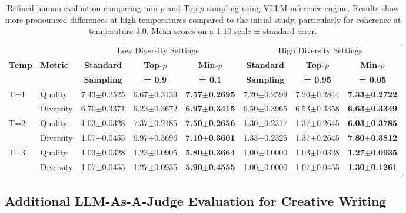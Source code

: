 \documentclass{article}
\begin{document}
\begin{table}[t]
    \centering
    \small
    \caption{Refined human evaluation comparing min-\( p \) and Top-\(p\) sampling using VLLM inference engine. Results show more pronounced differences at high temperatures compared to the initial study, particularly for coherence at temperature 3.0. Mean scores on a 1-10 scale ± standard error.}
    \label{tab:vllm_human_eval}
    \begin{tabular}{llcccccc}
        \toprule
        & & \multicolumn{3}{c}{Low Diversity Settings} & \multicolumn{3}{c}{High Diversity Settings} \\
        \cmidrule(lr){3-5} \cmidrule(lr){6-8}
        \textbf{Temp} & \textbf{Metric} & \textbf{Standard} & \textbf{Top-\(p\)} & \textbf{Min-\( p \)} & \textbf{Standard} & \textbf{Top-\(p\)} & \textbf{Min-\( p \)} \\
        & & \textbf{Sampling} & \textbf{= 0.9} & \textbf{= 0.1} & \textbf{Sampling} & \textbf{= 0.95} & \textbf{= 0.05} \\
        \midrule
        T=1 & Quality & 7.43$\pm$0.2525 & 6.67$\pm$0.3139 & \textbf{7.57$\pm$0.2695} & 7.20$\pm$0.2599 & 7.20$\pm$0.2844 & \textbf{7.33$\pm$0.2722} \\
        & Diversity & 6.70$\pm$0.3371 & 6.23$\pm$0.3672 & \textbf{6.97$\pm$0.3415} & 6.50$\pm$0.3965 & 6.53$\pm$0.3358 & \textbf{6.63$\pm$0.3349} \\
        \midrule
        T=2 & Quality & 1.03$\pm$0.0328 & 7.37$\pm$0.2185 & \textbf{7.50$\pm$0.2656} & 1.30$\pm$0.2317 & 1.37$\pm$0.2645 & \textbf{6.03$\pm$0.3785} \\
        & Diversity & 1.07$\pm$0.0455 & 6.97$\pm$0.3696 & \textbf{7.10$\pm$0.3601} & 1.33$\pm$0.2325 & 1.37$\pm$0.2645 & \textbf{7.80$\pm$0.3812} \\
        \midrule
        T=3 & Quality & 1.03$\pm$0.0328 & 1.23$\pm$0.0905 & \textbf{5.80$\pm$0.3664} & 1.00$\pm$0.0000 & 1.03$\pm$0.0328 & \textbf{1.27$\pm$0.0935} \\
        & Diversity & 1.07$\pm$0.0455 & 1.27$\pm$0.0935 & \textbf{5.90$\pm$0.4555} & 1.00$\pm$0.0000 & 1.07$\pm$0.0455 & \textbf{1.30$\pm$0.1261} \\
        \bottomrule
    \end{tabular}
\end{table}

\subsection{Additional LLM-As-A-Judge Evaluation for Creative Writing}
\end{document}
